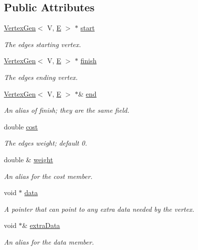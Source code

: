 \subsection*{Public Attributes}
\begin{DoxyCompactItemize}
\item 
\mbox{\hyperlink{classVertexGen}{Vertex\+Gen}}$<$ V, \mbox{\hyperlink{gmath_8h_ab587ba72a9c23f238cb4fd70e2fdb545}{E}} $>$ $\ast$ \mbox{\hyperlink{classEdgeGen_a07618520fc4dd27e13fbeb28ef912ffb}{start}}
\begin{DoxyCompactList}\small\item\em The edge\textquotesingle{}s starting vertex. \end{DoxyCompactList}\item 
\mbox{\hyperlink{classVertexGen}{Vertex\+Gen}}$<$ V, \mbox{\hyperlink{gmath_8h_ab587ba72a9c23f238cb4fd70e2fdb545}{E}} $>$ $\ast$ \mbox{\hyperlink{classEdgeGen_aa60a74288596350c2d66c545a2a57a4e}{finish}}
\begin{DoxyCompactList}\small\item\em The edge\textquotesingle{}s ending vertex. \end{DoxyCompactList}\item 
\mbox{\hyperlink{classVertexGen}{Vertex\+Gen}}$<$ V, \mbox{\hyperlink{gmath_8h_ab587ba72a9c23f238cb4fd70e2fdb545}{E}} $>$ $\ast$\& \mbox{\hyperlink{classEdgeGen_a338a2e11b46cc76b374b936584e4a76f}{end}}
\begin{DoxyCompactList}\small\item\em An alias of finish; they are the same field. \end{DoxyCompactList}\item 
double \mbox{\hyperlink{classEdgeGen_a3091a0127c4b13192de722c371142180}{cost}}
\begin{DoxyCompactList}\small\item\em The edge\textquotesingle{}s weight; default 0. \end{DoxyCompactList}\item 
double \& \mbox{\hyperlink{classEdgeGen_a733c9bb212a183a48d27a4c38c07ba31}{weight}}
\begin{DoxyCompactList}\small\item\em An alias for the \textquotesingle{}cost\textquotesingle{} member. \end{DoxyCompactList}\item 
void $\ast$ \mbox{\hyperlink{classEdgeGen_abd0e9b9aaaa307600977b1a092bcb8e9}{data}}
\begin{DoxyCompactList}\small\item\em A pointer that can point to any extra data needed by the vertex. \end{DoxyCompactList}\item 
void $\ast$\& \mbox{\hyperlink{classEdgeGen_a2ee72458d1bd9982be44df73377359d8}{extra\+Data}}
\begin{DoxyCompactList}\small\item\em An alias for the \textquotesingle{}data\textquotesingle{} member. \end{DoxyCompactList}\end{DoxyCompactItemize}


